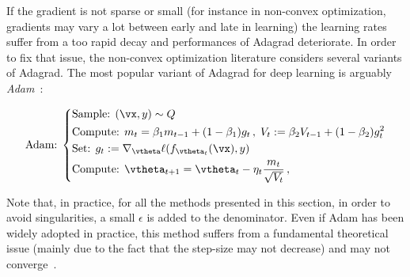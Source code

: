If the gradient is not sparse or small (for instance in non-convex optimization, gradients may vary a lot between early and late in learning) the learning rates suffer from a too rapid decay and performances of Adagrad deteriorate. In order to fix that issue, the non-convex optimization literature considers several variants of Adagrad. The most popular variant of Adagrad for deep learning is arguably \emph{Adam}~\citep{kingma2014adam}:

\begin{equation}
\text{Adam:} \;
\left\{
\begin{aligned}
&\text{Sample: } (\vx,y)\sim Q \\
&\text{Compute: } m_t = \beta_1 m_{t-1} + (1-\beta_1) g_t\, , \; V_t := \beta_2 V_{t-1} + (1-\beta_2)g_t^2 \\
&\text{Set: } g_t := \nabla_\vtheta \ell(f_{\vtheta_t}(\vx),y) \\
&\text{Compute: } \vtheta_{t+1} = \vtheta_t - \eta_t \frac{m_t}{\sqrt{V_t}} \,,
\end{aligned}
\right.
\end{equation}

Note that, in practice, for all the methods presented in this section, in order to avoid singularities, a small $\epsilon$ is added to the denominator. Even if Adam has been widely adopted in practice, this method suffers from a fundamental theoretical issue (mainly due to the fact that the step-size may not decrease) and may not converge~\citep{reddi2019convergence}. 













